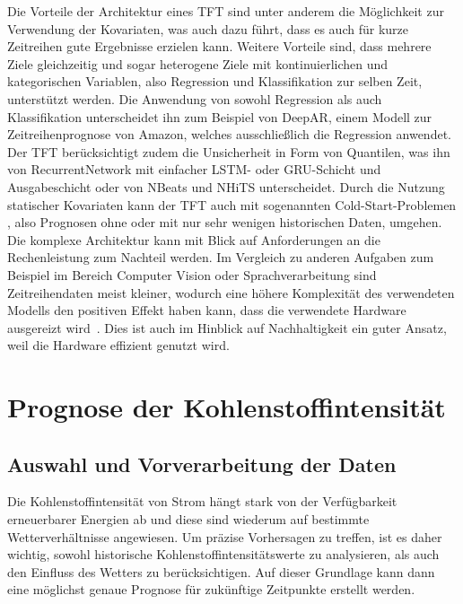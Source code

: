 Die Vorteile der Architektur eines \ac{TFT} sind unter anderem die Möglichkeit zur Verwendung der Kovariaten, was auch dazu führt, dass es auch für kurze Zeitreihen gute Ergebnisse erzielen kann.
Weitere Vorteile sind, dass mehrere Ziele gleichzeitig und sogar heterogene Ziele mit kontinuierlichen und kategorischen Variablen, also Regression und Klassifikation zur selben Zeit, unterstützt werden.
Die Anwendung von sowohl Regression als auch Klassifikation unterscheidet ihn zum Beispiel von DeepAR, einem Modell zur Zeitreihenprognose von Amazon, welches ausschließlich die Regression anwendet.
Der \ac{TFT} berücksichtigt zudem die Unsicherheit in Form von Quantilen, was ihn von RecurrentNetwork mit einfacher \ac{LSTM}- oder \ac{GRU}-Schicht und Ausgabeschicht oder von NBeats und NHiTS unterscheidet.
Durch die Nutzung statischer Kovariaten kann der \ac{TFT} auch mit sogenannten \glqq Cold-Start-Problemen \grqq{}, also Prognosen ohne oder mit nur sehr wenigen historischen Daten, umgehen.
Die komplexe Architektur kann mit Blick auf Anforderungen an die Rechenleistung zum Nachteil werden.
Im Vergleich zu anderen Aufgaben zum Beispiel im Bereich Computer Vision oder Sprachverarbeitung sind Zeitreihendaten meist kleiner, wodurch eine höhere Komplexität des verwendeten Modells den positiven Effekt haben kann, dass die verwendete Hardware ausgereizt wird~\cite{PytorchForecastingDocumentation.20230410T20:05:43.000Z}.
Dies ist auch im Hinblick auf Nachhaltigkeit ein guter Ansatz, weil die Hardware effizient genutzt wird.
\chapter{Prognose der Kohlenstoffintensität}\label{CAP:prediction}
\section{Auswahl und Vorverarbeitung der Daten}\label{CAP:data-preparation-analysis}
Die Kohlenstoffintensität von Strom hängt stark von der Verfügbarkeit erneuerbarer Energien ab und diese sind wiederum auf bestimmte Wetterverhältnisse angewiesen.
Um präzise Vorhersagen zu treffen, ist es daher wichtig, sowohl historische Kohlenstoffintensitätswerte zu analysieren, als auch den Einfluss des Wetters zu berücksichtigen.
Auf dieser Grundlage kann dann eine möglichst genaue Prognose für zukünftige Zeitpunkte erstellt werden.

